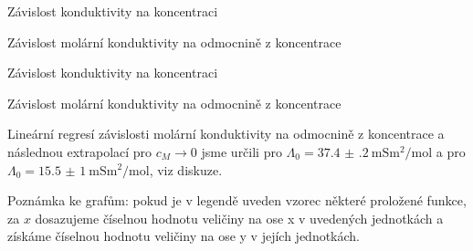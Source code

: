\begin{graph}[htbp] 
\centering

\caption{Závislost konduktivity  na koncentraci}
\label{g:sCl}
\end{graph}

\begin{graph}[htbp] 
\centering

\caption{Závislost molární konduktivity  na odmocnině z koncentrace}
\label{g:lCl}
\end{graph}

\begin{graph}[htbp] 
\centering

\caption{Závislost konduktivity  na koncentraci}
\label{g:sCH}
\end{graph}

\begin{graph}[htbp] 
\centering

\caption{Závislost molární konduktivity  na odmocnině z koncentrace}
\label{g:lCH}
\end{graph}

Lineární regresí závislosti molární konduktivity na odmocnině z koncentrace a následnou extrapolací pro $c_M \to 0$ jsme určili pro  $\Lambda_0=\SI{37.4(2)}{\milli\siemens\metre\squared\per\mole}$ a pro  $\Lambda_0=\SI{15.5(10)}{\milli\siemens\metre\squared\per\mole}$, viz diskuze.

Poznámka ke grafům: pokud je v legendě uveden vzorec některé proložené funkce, za $x$ dosazujeme číselnou hodnotu veličiny na ose x v uvedených jednotkách a získáme číselnou hodnotu veličiny na ose y v jejích jednotkách.
